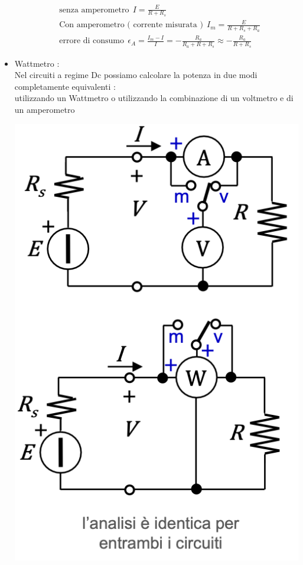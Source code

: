 \documentclass{article}
\theoremstyle{definition}
\begin{document}
\begin{itemize}
\begin{center}
	\end{center}
	\begin{align*}
		& \text{senza amperometro} \ \ I=\frac{E}{R+R_s}\\
		& \text{Con amperometro ( corrente misurata )} \ \ I_m=\frac{E}{R+R_s+R_a}\\
		& \text{errore di consumo} \ \ \epsilon_A=\frac{I_m-I}{I}=-\frac{R_a}{R_a+R+R_s}\approx -\frac{R_a}{R+R_s}
	\end{align*}
	\item Wattmetro : \\
	Nel circuiti a regime Dc possiamo calcolare la potenza in due modi completamente equivalenti : \\ utilizzando un Wattmetro o utilizzando la combinazione di un voltmetro e di un amperometro 
	\begin{center}
		\includegraphics[scale=0.35]{immagini/wat}

\end{center}
\end{itemize}
\end{document}
